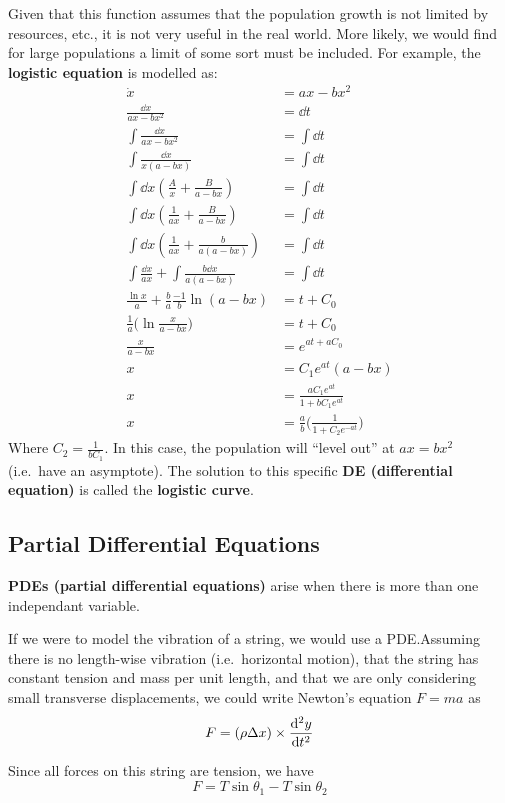 \documentclass[12pt]{article}
\begin{document}
Given that this function assumes that the population growth is not limited by resources, etc., it is not very useful in the real world. More likely, we would find for large populations a limit of some sort must be included. For example, the {\bf logistic equation} is modelled as:
\begin{align*}
\dot x &= ax - bx^2\\
\frac{\dd x}{ax - bx^2} &= \dd t\\
\int \frac{\dd x}{ax - bx^2} &= \int \dd t\\
\int \frac{\dd x}{x(a - bx)} &= \int \dd t\\
\int \dd x (\frac{A}{x} + \frac{B}{a - bx}) &= \int \dd t\\
\int \dd x (\frac{1}{ax} + \frac{B}{a - bx}) &= \int \dd t\\
\int \dd x (\frac{1}{ax} + \frac{b}{a(a - bx)}) &= \int \dd t\\
\int \frac{\dd x}{ax} + \int \frac{b \dd x}{a(a - bx)} &= \int \dd t\\
\frac{\ln x}{a} + \frac{b}{a}\frac{-1}{b}\ln(a - bx) &= t + C_0\\
\frac{1}{a} \bigg(\ln\frac{x}{a - bx}\bigg) &= t + C_0\\
\frac{x}{a - bx} &= e^{at + aC_0}\\
x &= C_1 e^{at} (a - bx)\\
x &= \frac{aC_1 e^{at}}{1 + bC_1e^{at}}\\
x &= \frac{a}{b} \bigg(\frac{1}{1 + C_2 e^{-at}}\bigg)
\end{align*}
Where $C_2 = \frac{1}{bC_1}$. In this case, the population will ``level out'' at $ax = bx^2$ (i.e.\ have an asymptote). The solution to this specific {\bf DE (differential equation)} is called the {\bf logistic curve}.

\subsection{Partial Differential Equations}
{\bf PDEs (partial differential equations)} arise when there is more than one independant variable.

If we were to model the vibration of a string, we would use a PDE.\@ Assuming there is no length-wise vibration (i.e.\ horizontal motion), that the string has constant tension and mass per unit length, and that we are only considering small transverse displacements, we could write Newton's equation $F = ma$ as \[ F = (\rho\Delta x) \times \frac{{\rm d}^2 y}{{\rm d} t^2} \]

Since all forces on this string are tension, we have \[ F = T\sin\theta_1 - T\sin\theta_2 \]
\end{document}
